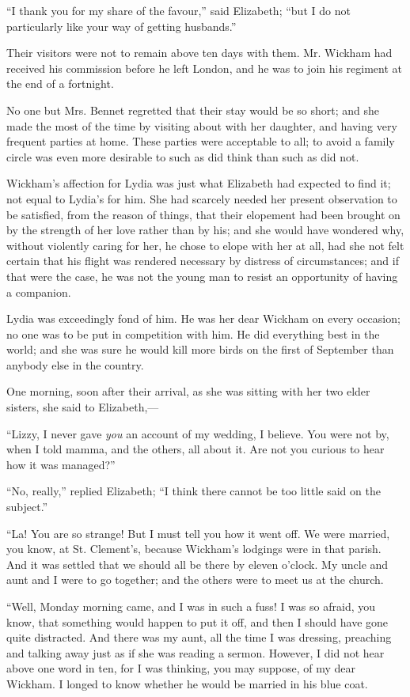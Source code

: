 \documentclass[12pt,openright]{book}
\begin{document}
“I thank you for my share of the favour,” said Elizabeth; “but I do not particularly like your way of getting husbands.”

Their visitors were not to remain above ten days with them. Mr. Wickham had received his commission before he left London, and he was to join his regiment at the end of a fortnight.

No one but Mrs. Bennet regretted that their stay would be so short; and she made the most of the time by visiting about with her daughter, and having very frequent parties at home. These parties were acceptable to all; to avoid a family circle was even more desirable to such as did think than such as did not.

Wickham’s affection for Lydia was just what Elizabeth had expected to find it; not equal to Lydia’s for him. She had scarcely needed her present observation to be satisfied, from the reason of things, that their elopement had been brought on by the strength of her love rather than by his; and she would have wondered why, without violently caring for her, he chose to elope with her at all, had she not felt certain that his flight was rendered necessary by distress of circumstances; and if that were the case, he was not the young man to resist an opportunity of having a companion.

Lydia was exceedingly fond of him. He was her dear Wickham on every occasion; no one was to be put in competition with him. He did everything best in the world; and she was sure he would kill more birds on the first of September than anybody else in the country.

One morning, soon after their arrival, as she was sitting with her two elder sisters, she said to Elizabeth,—

“Lizzy, I never gave \textit{you} an account of my wedding, I believe. You were not by, when I told mamma, and the others, all about it. Are not you curious to hear how it was managed?”

“No, really,” replied Elizabeth; “I think there cannot be too little said on the subject.”

“La! You are so strange! But I must tell you how it went off. We were married, you know, at St. Clement’s, because Wickham’s lodgings were in that parish. And it was settled that we should all be there by eleven o’clock. My uncle and aunt and I were to go together; and the others were to meet us at the church.

“Well, Monday morning came, and I was in such a fuss! I was so afraid, you know, that something would happen to put it off, and then I should have gone quite distracted. And there was my aunt, all the time I was dressing, preaching and talking away just as if she was reading a sermon. However, I did not hear above one word in ten, for I was thinking, you may suppose, of my dear Wickham. I longed to know whether he would be married in his blue coat.
\end{document}
